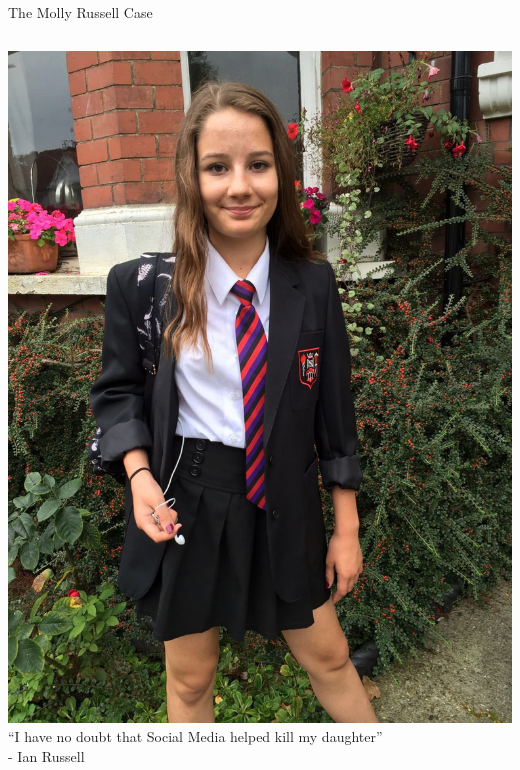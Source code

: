 \documentclass[nobackground,dvipsnames,table,aspectratio=169]{beamer}
\begin{document}
\begin{frame}{The Molly Russell Case}
    \begin{columns}
            \includegraphics[width=\textwidth]{molly-russell}
            \centering
            \large
            “I have no doubt that Social Media helped kill my daughter”\\
            - Ian Russell
    \end{columns}
\end{frame}
\end{document}
